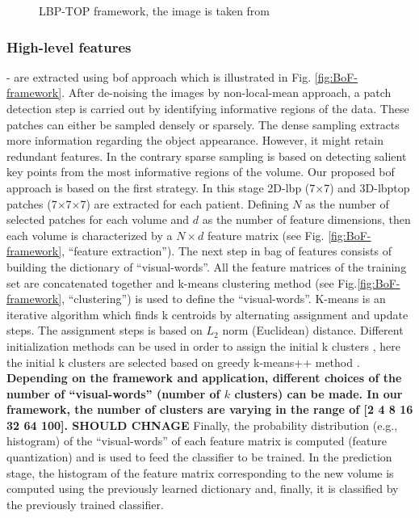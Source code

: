 \begin{figure}
\caption{LBP-TOP framework, the image is taken from \cite{JiangEtAl13}}
\label{fig:LBPTOP-framework}
\end{figure}



\subsubsection{High-level features} - are extracted using \ac{bof} approach which is illustrated in Fig. \ref{fig:BoF-framework}. After de-noising the images by non-local-mean approach, a patch detection step is carried out by identifying informative regions of the data. These patches can either be sampled densely or sparsely. The dense sampling extracts more information regarding the object appearance. However, it might retain redundant features. In the contrary sparse sampling is based on detecting salient key points from the most informative regions of the volume. Our proposed \ac{bof} approach is based on the first strategy. In this stage 2D-\ac{lbp} (7$\times$7) and 3D-\ac{lbptop} patches (7$\times$7$\times$7) are extracted for each patient. Defining $N$ as the number of selected patches for each volume and $d$ as the number of feature dimensions, then each volume is characterized by a $N \times d$ feature matrix (see Fig. \ref{fig:BoF-framework}, ``feature extraction''). The next step in bag of features consists of building the dictionary of ``visual-words''. All the feature matrices of the training set are concatenated together and k-means clustering method (see Fig.\ref{fig:BoF-framework}, ``clustering'') is used to define the ``visual-words''. K-means is an iterative algorithm which finds k centroids by alternating assignment and update steps. The assignment steps is based on $L_{2}$ norm (Euclidean) distance. Different initialization methods can be used in order to assign the initial k clusters \cite {celebi2013comparative}, here the initial k clusters are selected based on greedy k-means++ method \cite{arthur2007k}. \textbf{Depending on the framework and application, different choices of the number of ``visual-words'' (number of $k$ clusters) can be made. In our framework, the number of clusters are varying in the range of [2 4 8 16 32 64 100]. SHOULD CHNAGE} Finally, the probability distribution (e.g., histogram) of the ``visual-words'' of each feature matrix is computed (feature quantization) and is used to feed the classifier to be trained. In the prediction stage, the histogram of the feature matrix corresponding to the new volume is computed using the previously learned dictionary and, finally, it is classified by the previously trained classifier.\\


